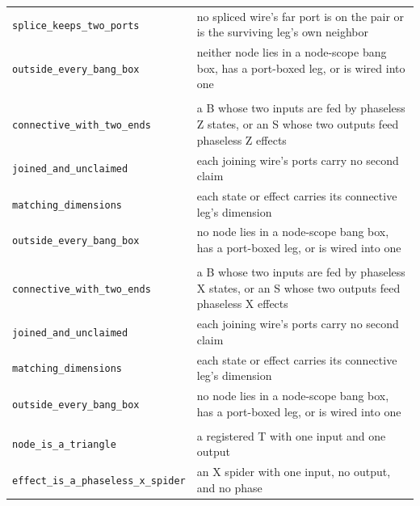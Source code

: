 \begin{xltabular}{\textwidth}{@{}>{\raggedright\arraybackslash}p{0.42\textwidth}>{\raggedright\arraybackslash}X@{}}
\quad\texttt{splice\_\allowbreak{}keeps\_\allowbreak{}two\_\allowbreak{}ports} & no spliced wire's far port is on the pair or is the surviving leg's own neighbor \\
\quad\texttt{outside\_\allowbreak{}every\_\allowbreak{}bang\_\allowbreak{}box} & neither node lies in a node-scope bang box, has a port-boxed leg, or is wired into one \\
\midrule
{}\\
\quad\texttt{connective\_\allowbreak{}with\_\allowbreak{}two\_\allowbreak{}ends} & a B whose two inputs are fed by phaseless Z states, or an S whose two outputs feed phaseless Z effects \\
\quad\texttt{joined\_\allowbreak{}and\_\allowbreak{}unclaimed} & each joining wire's ports carry no second claim \\
\quad\texttt{matching\_\allowbreak{}dimensions} & each state or effect carries its connective leg's dimension \\
\quad\texttt{outside\_\allowbreak{}every\_\allowbreak{}bang\_\allowbreak{}box} & no node lies in a node-scope bang box, has a port-boxed leg, or is wired into one \\
\midrule
{}\\
\quad\texttt{connective\_\allowbreak{}with\_\allowbreak{}two\_\allowbreak{}ends} & a B whose two inputs are fed by phaseless X states, or an S whose two outputs feed phaseless X effects \\
\quad\texttt{joined\_\allowbreak{}and\_\allowbreak{}unclaimed} & each joining wire's ports carry no second claim \\
\quad\texttt{matching\_\allowbreak{}dimensions} & each state or effect carries its connective leg's dimension \\
\quad\texttt{outside\_\allowbreak{}every\_\allowbreak{}bang\_\allowbreak{}box} & no node lies in a node-scope bang box, has a port-boxed leg, or is wired into one \\
\midrule
{}\\
\quad\texttt{node\_\allowbreak{}is\_\allowbreak{}a\_\allowbreak{}triangle} & a registered T with one input and one output \\
\quad\texttt{effect\_\allowbreak{}is\_\allowbreak{}a\_\allowbreak{}phaseless\_\allowbreak{}x\_\allowbreak{}spider} & an X spider with one input, no output, and no phase \\

\end{xltabular}
